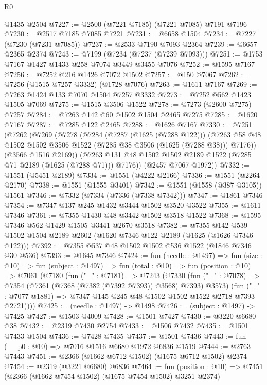 \begin{lexlean}{R0}
\begin{coremodule}
    @1435
    @2504
@7227 := @2500 (@7221 @7185) (@7221 @7085) @7191 @7196
@7230 := @2517 @7185 @7085 @7221
@7231 := @6658 @1504
@7234 := @7227 (@7230 (@7231 @7085))
@7237 := @2533 @7190 @7093 @2364
@7239 := @6657 @2365 @2374
@7243 := @7199 (@7234 (@7237 (@7239 @7093)))
@7251 := @1753 @7167 @1427 @1433 @258 @7074 @3449 @3455 @7076
@7252 := @1595 @7167
@7256 := @7252 @216 @1426 @7072 @1502
@7257 := @150 @7067
@7262 := @7256 (@1515 @7257 @3332) (@1728 @7076)
@7263 := @1611 @7167
@7269 := @7263 @1424 @133 @7070 @1504 @7257 @3332
@7273 := @7252 @562 @1423 @1505 @7069
@7275 := @1515 @3506 @1522
@7278 := @7273 (@2600 @7275) @7257
@7284 := @7263 @142 @60 @1502 @1504 @2465 @7275
@7285 := @1620 @7167
@7287 := @7285 @122 @2465
@7288 := @1626 @7167
@7330 := @7251
    (@7262
      (@7269
        (@7278
          (@7284
            (@7287 (@1625 (@7288 @122)))
            (@7263 @58 @48 @1502 @1502 @3506 @1522 (@7285 @38 @3506 (@1625 (@7288 @38))) @7176))
          (@3566 @1516 @2169))
        (@7263 @131 @48 @1502 @1502 @2189 @1522 (@7285 @71 @2189 (@1625 (@7288 @71))) @7176))
      (@2457 @7067 @1972))
@7332 := @1551 (@5451 @2189)
@7334 := @1551 (@4222 @2166)
@7336 := @1551 (@2264 @2170)
@7338 := @1551 (@1555 @3401)
@7342 := @1551 (@1558 (@387 @3105)) @1561
@7346 := @7332 (@7334 (@7336 (@7338 @7342)))
@7347 := @1861 @7346
@7354 := @7347 @137 @245 @1432 @3444 @1502 @3520 @3522
@7355 := @1611 @7346
@7361 := @7355 @1430 @48 @3442 @1502 @3518 @1522
@7368 := @1595 @7346 @562 @1429 @1505 @3441 @2670 @3518
@7382 := @7355 @142 @539 @1502 @1504 @2189 @2602 (@1620 @7346 @122 @2189 (@1625 (@1626 @7346 @122)))
@7392 := @7355 @537 @48 @1502 @1502 @536 @1522 (@1846 @7346 @30 @536)
@7393 := @1645 @7346
@7424 := fun (needle : @1497) =>
  fun (size : @10) =>
  fun (subject : @1497) =>
  fun (total : @10) =>
  fun (position : @10) =>
  @7061
    (@7180
      (fun ("_" : @7181) =>
      @7243
        (@7330
          (fun ("_" : @7078) => @7354 (@7361 (@7368 (@7382 (@7392 @7393)) @3568) @7393) @3573)
          (fun ("_" : @7077 @1881) => @7347 @145 @245 @48 @1502 @1502 @1522 @2718 @7393 @2721))))
@7425 := (needle : @1497) -> @1498
@7426 := (subject : @1497) -> @7425
@7427 := @1503 @4009
@7428 := @1501 @7427
@7430 := @3220 @6680 @38
@7432 := @2319 @7430 @2754
@7433 := @1506 @7432
@7435 := @1501 @7433 @1504
@7436 := @7428 @7435
@7437 := @1501 @7436
@7443 := fun (__p0 : @10) => @7016 @1516 @6680 @1972 @6836 @1519
@7444 := @2763 @7443
@7451 := @2366 (@1662 @6712 @1502) (@1675 @6712 @1502) @2374
@7454 := @2319 (@3221 @6680) @6836
@7464 := fun (position : @10) => @7451 (@2366 (@1662 @7454 @1502) (@1675 @7454 @1502) @3251 @2374)

\end{coremodule}
\end{lexlean}
